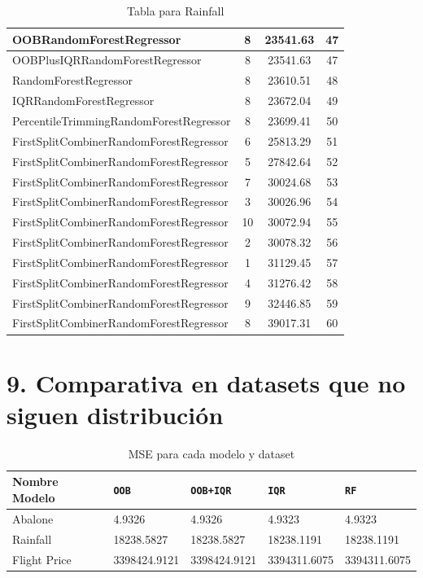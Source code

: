 \begin{table}[h]
\begin{tabular}{|l|c|c|c|}
\textcolor[HTML]{b33dc6}{OOBRandomForestRegressor} & 8 & 23541.63 & 47 \\ \hline
\textcolor[HTML]{ede15b}{OOBPlusIQRRandomForestRegressor} & 8 & 23541.63 & 47 \\ \hline
\textcolor[HTML]{87bc45}{RandomForestRegressor} & 8 & 23610.51 & 48 \\ \hline
\textcolor[HTML]{27aeef}{IQRRandomForestRegressor} & 8 & 23672.04 & 49 \\ \hline
\textcolor[HTML]{f46a9b}{PercentileTrimmingRandomForestRegressor} & 8 & 23699.41 & 50 \\ \hline
\textcolor[HTML]{ea5545}{FirstSplitCombinerRandomForestRegressor} & 6 & 25813.29 & 51 \\ \hline
\textcolor[HTML]{ea5545}{FirstSplitCombinerRandomForestRegressor} & 5 & 27842.64 & 52 \\ \hline
\textcolor[HTML]{ea5545}{FirstSplitCombinerRandomForestRegressor} & 7 & 30024.68 & 53 \\ \hline
\textcolor[HTML]{ea5545}{FirstSplitCombinerRandomForestRegressor} & 3 & 30026.96 & 54 \\ \hline
\textcolor[HTML]{ea5545}{FirstSplitCombinerRandomForestRegressor} & 10 & 30072.94 & 55 \\ \hline
\textcolor[HTML]{ea5545}{FirstSplitCombinerRandomForestRegressor} & 2 & 30078.32 & 56 \\ \hline
\textcolor[HTML]{ea5545}{FirstSplitCombinerRandomForestRegressor} & 1 & 31129.45 & 57 \\ \hline
\textcolor[HTML]{ea5545}{FirstSplitCombinerRandomForestRegressor} & 4 & 31276.42 & 58 \\ \hline
\textcolor[HTML]{ea5545}{FirstSplitCombinerRandomForestRegressor} & 9 & 32446.85 & 59 \\ \hline
\textcolor[HTML]{ea5545}{FirstSplitCombinerRandomForestRegressor} & 8 & 39017.31 & 60 \\ \hline
\end{tabular}
\caption{Tabla para Rainfall}
\end{table}

\FloatBarrier

\section*{9. Comparativa en datasets que no siguen distribución}
\label{appendix9}

\begin{table}[h]
\centering
    \caption{MSE para cada modelo y dataset}
\begin{tabularx}{\textwidth}{l X X X X}
\toprule
\textbf{Nombre Modelo} & \textbf{\texttt{OOB}} & \textbf{\texttt{OOB+IQR}} & \textbf{\texttt{IQR}} & \textbf{\texttt{RF}}  \\
\midrule
Abalone & 4.9326 & 4.9326 & 4.9323 & 4.9323 \\
Rainfall & 18238.5827 & 18238.5827 & 18238.1191 & 18238.1191 \\
Flight Price & 3398424.9121 &  3398424.9121 & 3394311.6075 & 3394311.6075 \\
\bottomrule
\end{tabularx}
\end{table}

